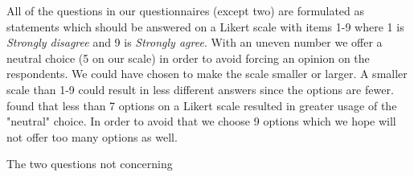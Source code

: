 All of the questions in our questionnaires (except two) are formulated as statements which should be answered on a Likert scale \cite{likert1932technique} with items 1-9 where 1 is \emph{Strongly disagree} and 9 is \emph{Strongly agree}. With an uneven number we offer a neutral choice (5 on our scale) in order to avoid forcing an opinion on the respondents. We could have chosen to make the scale smaller or larger. A smaller scale than 1-9 could result in less different answers since the options are fewer.  found that less than 7 options on a Likert scale resulted in greater usage of the "neutral" choice. In order to avoid that we choose 9 options which we hope will not offer too many options as well.

The two questions not concerning 






















